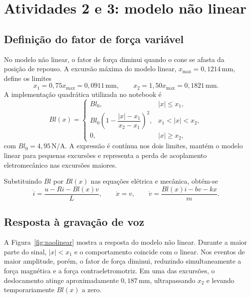 \documentclass[11pt,letterpaper]{article}
\begin{document}
\section{Atividades 2 e 3: modelo não linear}

\subsection{Definição do fator de força variável}

No modelo não linear, o fator de força diminui quando o cone se afasta da posição de repouso. A
excursão máxima do modelo linear, $x_{\max}=0{,}1214\,\mathrm{mm}$, define os limites
\begin{equation}
  x_1=0{,}75x_{\max}=0{,}0911\,\mathrm{mm},\qquad
  x_2=1{,}50x_{\max}=0{,}1821\,\mathrm{mm}.
  \label{eq:limites}
\end{equation}
A implementação quadrática utilizada no notebook é
\begin{equation}
Bl(x)=
\begin{cases}
Bl_0, & |x|\leq x_1,\\[2mm]
Bl_0\left(1-\dfrac{|x|-x_1}{x_2-x_1}\right)^2,
  & x_1<|x|<x_2,\\[3mm]
0, & |x|\geq x_2,
\end{cases}
\label{eq:bl-nl}
\end{equation}
com $Bl_0=4{,}95\,\mathrm{N/A}$. A expressão é contínua nos dois limites, mantém o modelo linear
para pequenas excursões e representa a perda de acoplamento eletromecânico nas excursões maiores.

Substituindo $Bl$ por $Bl(x)$ nas equações elétrica e mecânica, obtém-se
\begin{equation}
  \dot{i}=\frac{u-Ri-Bl(x)v}{L},\qquad
  \dot{x}=v,\qquad
  \dot{v}=\frac{Bl(x)i-bv-kx}{m}.
  \label{eq:modelo-nl}
\end{equation}

\subsection{Resposta à gravação de voz}

A Figura~\ref{fig:naolinear} mostra a resposta do modelo não linear. Durante a maior parte do
sinal, $|x|<x_1$ e o comportamento coincide com o linear. Nos eventos de maior amplitude, porém,
o fator de força diminui, reduzindo simultaneamente a força magnética e a força contraeletromotriz.
Em uma das excursões, o deslocamento atinge aproximadamente $0{,}187\,\mathrm{mm}$, ultrapassando
$x_2$ e levando temporariamente $Bl(x)$ a zero.
\end{document}
